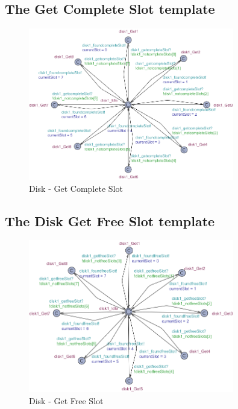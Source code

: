 \newpage
\subsection{The Get Complete Slot template}
\begin{figure}[H]
    \centering
    \includegraphics[width=0.8\textwidth]{Image/uppaal-templates/disk1_GetcompleteSlot.png}
    \caption{Disk - Get Complete Slot}
    \label{fig:complete_slot}
\end{figure}

\newpage
\subsection{The Disk Get Free Slot template}
\begin{figure}[H]
    \centering
    \includegraphics[width=0.8\textwidth]{Image/uppaal-templates/disk1_GetfreeSlot.png}
    \caption{Disk - Get Free Slot}
    \label{fig:free_slot}
\end{figure}

\newpage
